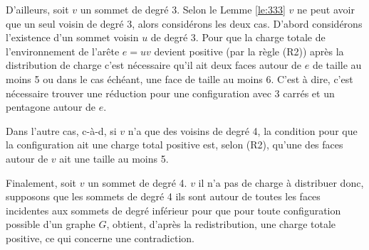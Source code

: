 \documentclass[10pt,a4paper]{article}
\begin{document}
D'ailleurs, soit $v$ un sommet de degré 3. Selon le Lemme \ref{le:333} $v$ ne peut avoir que un seul voisin de degré 3, alors considérons les deux cas. D'abord considérons l'existence d'un sommet voisin $u$ de degré 3. Pour que la charge totale de l'environnement de l'arête $e=uv$ devient positive (par la règle (R2)) après la distribution de charge c'est nécessaire qu'il ait deux faces autour de $e$ de taille au moins 5 ou dans le cas échéant, une face de taille au moins 6. C'est à dire, c'est nécessaire trouver une réduction pour une configuration avec 3 carrés et un pentagone autour de $e$. 

Dans l'autre cas, c-à-d, si $v$ n'a que des voisins de degré 4, la condition pour que la configuration ait une charge total positive est, selon (R2), qu'une des faces autour de $v$ ait une taille au moins 5.

Finalement, soit $v$ un sommet de degré 4. $v$ il n'a pas de charge à distribuer donc, supposons que les sommets de degré 4 ils sont autour de toutes les faces incidentes aux sommets de degré inférieur pour que pour toute configuration possible d'un graphe $G$, obtient, d'après la redistribution, une charge totale positive, ce qui concerne une contradiction.






\end{document}
